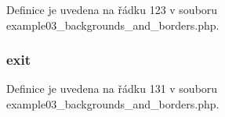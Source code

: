 Definice je uvedena na řádku 123 v souboru example03\-\_\-backgrounds\-\_\-and\-\_\-borders.\-php.

\hypertarget{example03__backgrounds__and__borders_8php_a6733eb5f605d09eaede9845835d71c4e}{
\subsubsection[{exit}]{\setlength{\rightskip}{0pt plus 5cm}exit}}\label{example03__backgrounds__and__borders_8php_a6733eb5f605d09eaede9845835d71c4e}


Definice je uvedena na řádku 131 v souboru example03\-\_\-backgrounds\-\_\-and\-\_\-borders.\-php.

